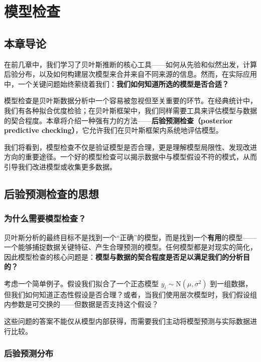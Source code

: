
\chapter{模型检查}

\section{本章导论}

在前几章中，我们学习了贝叶斯推断的核心工具——如何从先验和似然出发，计算后验分布，以及如何构建层次模型来合并来自不同来源的信息。然而，在实际应用中，一个关键问题始终萦绕着我们：\textbf{我们如何知道所选的模型是否合适？}

模型检查是贝叶斯数据分析中一个容易被忽视但至关重要的环节。在经典统计中，我们有各种拟合优度检验；在贝叶斯框架中，我们同样需要工具来评估模型与数据的契合程度。本章将介绍一种强有力的方法——\textbf{后验预测检查（posterior predictive checking）}，它允许我们在贝叶斯框架内系统地评估模型。

我们将看到，模型检查不仅是验证模型是否合理，更是理解模型局限性、发现改进方向的重要途径。一个好的模型检查可以揭示数据中与模型假设不符的模式，从而引导我们改进模型或收集更多数据。

\section{后验预测检查的思想}

\subsection{为什么需要模型检查？}

贝叶斯分析的最终目标不是找到一个``正确''的模型，而是找到一个\textbf{有用}的模型——一个能够捕捉数据关键特征、产生合理预测的模型。任何模型都是对现实的简化，因此模型检查的核心问题是：\textbf{模型与数据的契合程度是否足以满足我们的分析目的？}

考虑一个简单例子。假设我们拟合了一个正态模型 $y_i \sim \mathrm{N}(\mu, \sigma^2)$ 到一组数据，但我们如何知道正态性假设是否合理？或者，当我们使用层次模型时，我们假设组内参数是可交换的——但数据是否支持这个假设？

这些问题的答案不能仅从模型内部获得，而需要我们主动将模型预测与实际数据进行比较。

\subsection{后验预测分布}

